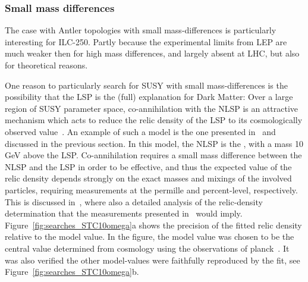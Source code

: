 \subsubsection{Small mass differences}
\label{subsec:searches_lowdm}
The case with Antler topologies with small mass-differences
is particularly interesting for ILC-250.
Partly because the experimental limits from LEP are much weaker then
for high mass differences,
and largely absent at LHC,
but also for theoretical reasons.

One reason to particularly search for SUSY with small
mass-differences is the possibility that the LSP is the (full) explanation
for Dark Matter:
Over a large region of SUSY parameter space, co-annihilation with the NLSP
is an attractive mechanism which acts to reduce the relic density of the LSP to its
cosmologically observed value~\cite{deVries:2015hva}. 
An example of such a model is the one presented in~\cite{Berggren:2015qua} and
discussed in the previous section.
In this model,
the NLSP is the \stone,
with a mass 10 GeV above the LSP.
Co-annihilation requires
a small mass difference between the NLSP and the LSP in order to be effective,
and thus the expected value of the relic density depends strongly on the exact
masses and mixings of the involved particles, requiring measurements at the permille and
percent-level, respectively.
This is discussed in~\cite{Lehtinen:415433}, 
where also a detailed analysis of the relic-density determination that
the measurements presented in~\cite{Berggren:2015qua} would imply.
Figure~\ref{fig:searches_STC10omega}a shows the precision
of the fitted relic density relative to the model value.
In the figure, 
the model value was chosen to be
the central value determined from cosmology using the observations 
of {\sc planck}~\cite{Ade:2015xua}.
It was also verified the other model-values were faithfully reproduced
by the fit, see Figure~\ref{fig:searches_STC10omega}b.
